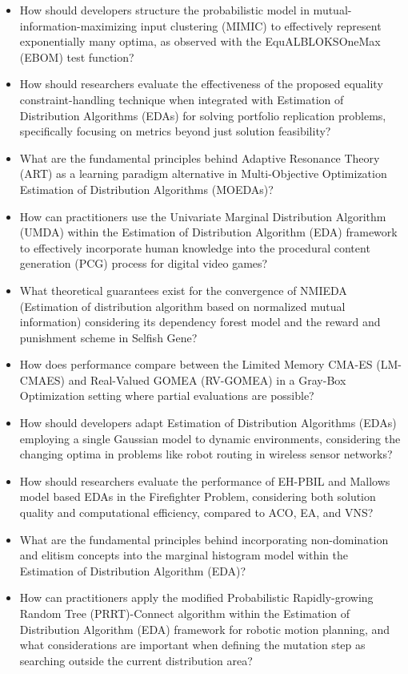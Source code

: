 \begin{itemize}[noitemsep]
    \item How should developers structure the probabilistic model in mutual-information-maximizing input clustering (MIMIC) to effectively represent exponentially many optima, as observed with the EquALBLOKSOneMax (EBOM) test function?
    \item How should researchers evaluate the effectiveness of the proposed equality constraint-handling technique when integrated with Estimation of Distribution Algorithms (EDAs) for solving portfolio replication problems, specifically focusing on metrics beyond just solution feasibility?
    \item What are the fundamental principles behind Adaptive Resonance Theory (ART) as a learning paradigm alternative in Multi-Objective Optimization Estimation of Distribution Algorithms (MOEDAs)?
    \item How can practitioners use the Univariate Marginal Distribution Algorithm (UMDA) within the Estimation of Distribution Algorithm (EDA) framework to effectively incorporate human knowledge into the procedural content generation (PCG) process for digital video games?
    \item What theoretical guarantees exist for the convergence of NMIEDA (Estimation of distribution algorithm based on normalized mutual information) considering its dependency forest model and the reward and punishment scheme in Selfish Gene?
    \item How does performance compare between the Limited Memory CMA-ES (LM-CMAES) and Real-Valued GOMEA (RV-GOMEA) in a Gray-Box Optimization setting where partial evaluations are possible?
    \item How should developers adapt Estimation of Distribution Algorithms (EDAs) employing a single Gaussian model to dynamic environments, considering the changing optima in problems like robot routing in wireless sensor networks?
    \item How should researchers evaluate the performance of EH-PBIL and Mallows model based EDAs in the Firefighter Problem, considering both solution quality and computational efficiency, compared to ACO, EA, and VNS?
    \item What are the fundamental principles behind incorporating non-domination and elitism concepts into the marginal histogram model within the Estimation of Distribution Algorithm (EDA)?
    \item How can practitioners apply the modified Probabilistic Rapidly-growing Random Tree (PRRT)-Connect algorithm within the Estimation of Distribution Algorithm (EDA) framework for robotic motion planning, and what considerations are important when defining the mutation step as searching outside the current distribution area?

\end{itemize}
